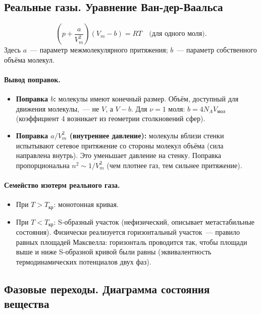 \documentclass[12pt]{article}
\begin{document}
\subsection{Реальные газы. Уравнение Ван-дер-Ваальса}

\begin{definition}
	\[
		\left(p + \frac{a}{V_m^2}\right)(V_m - b) = RT \quad \text{(для одного моля)}.
	\]
	Здесь $a$~--- параметр межмолекулярного притяжения; $b$~--- параметр собственного объёма молекул.
\end{definition}

\paragraph{Вывод поправок.}
\begin{itemize}
	\item \textbf{Поправка $b$:} молекулы имеют конечный размер. Объём, доступный для движения молекулы,~--- не $V$, а $V - b$. Для $\nu = 1$ моля: $b = 4N_A V_{\text{мол}}$ (коэффициент 4 возникает из геометрии столкновений сфер).

	\item \textbf{Поправка $a/V_m^2$ (внутреннее давление):} молекулы вблизи стенки испытывают сетевое притяжение со стороны молекул объёма (сила направлена внутрь). Это уменьшает давление на стенку. Поправка пропорциональна $n^2 \sim 1/V_m^2$ (чем плотнее газ, тем сильнее притяжение).
\end{itemize}

\paragraph{Семейство изотерм реального газа.}
\begin{itemize}
	\item При $T > T_{\text{кр}}$: монотонная кривая.
	\item При $T < T_{\text{кр}}$: S-образный участок (нефизический, описывает метастабильные состояния). Физически реализуется горизонтальный участок~--- правило равных площадей Максвелла: горизонталь проводится так, чтобы площади выше и ниже S-образной кривой были равны (эквивалентность термодинамических потенциалов двух фаз).
\end{itemize}

\subsection{Фазовые переходы. Диаграмма состояния вещества}
\end{document}
